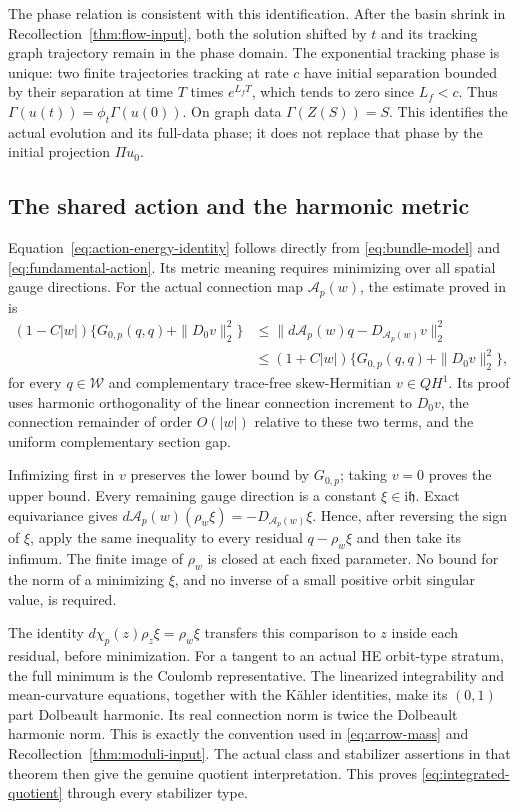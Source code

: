 The phase relation is consistent with this identification.
After the basin shrink in Recollection~\ref{thm:flow-input},
both the solution shifted by $t$ and its tracking graph
trajectory remain in the phase domain. The exponential
tracking phase is unique: two finite trajectories tracking
at rate $c$ have initial separation bounded by their
separation at time $T$ times $e^{L_fT}$, which tends to
zero since $L_f<c$. Thus
$\Gamma(u(t))=\phi_t\Gamma(u(0))$.
On graph data $\Gamma(Z(S))=S$.
This identifies the actual evolution and its full-data
phase; it does not replace that phase by the initial
projection $\Pi u_0$.

\subsection{The shared action and the harmonic metric}

Equation~\eqref{eq:action-energy-identity} follows directly
from \eqref{eq:bundle-model} and
\eqref{eq:fundamental-action}. Its metric meaning requires
minimizing over all spatial gauge directions.
For the actual connection map $\mathcal A_p(w)$, the
estimate proved in \cite[Section~12]{W_HYM} is
\begin{equation}\label{eq:spatial-gauge-comparison}
 \begin{split}
 (1-C|w|)\{G_{0,p}(q,q)+\|D_0v\|_2^2\}
 &\le\|d\mathcal A_p(w)q-D_{\mathcal A_p(w)}v\|_2^2\\
 &\le(1+C|w|)\{G_{0,p}(q,q)+\|D_0v\|_2^2\},
 \end{split}
\end{equation}
for every $q\in\mathcal W$ and complementary trace-free
skew-Hermitian $v\in QH^1$.
Its proof uses harmonic orthogonality of the linear
connection increment to $D_0v$, the connection remainder
of order $O(|w|)$ relative to these two terms, and the
uniform complementary section gap.

Infimizing first in $v$ preserves the lower bound by
$G_{0,p}$; taking $v=0$ proves the upper bound.
Every remaining gauge direction is a constant
$\xi\in\mathrm i\mathfrak h$. Exact equivariance gives
$d\mathcal A_p(w)(\rho_w\xi)=-D_{\mathcal A_p(w)}\xi$.
Hence, after reversing the sign of $\xi$, apply the
same inequality to every residual $q-\rho_w\xi$ and
then take its infimum. The finite image of $\rho_w$
is closed at each fixed parameter. No bound for the
norm of a minimizing $\xi$, and no inverse of a small
positive orbit singular value, is required.

The identity $d\chi_p(z)\rho_z\xi=\rho_w\xi$ transfers
this comparison to $z$ inside each residual, before
minimization. For a tangent to an actual HE orbit-type
stratum, the full minimum is the Coulomb representative.
The linearized integrability and mean-curvature equations,
together with the K\"ahler identities, make its $(0,1)$
part Dolbeault harmonic. Its real connection norm is twice
the Dolbeault harmonic norm. This is exactly the convention
used in \eqref{eq:arrow-mass} and
Recollection~\ref{thm:moduli-input}.
The actual class and stabilizer assertions in that theorem
then give the genuine quotient interpretation.
This proves \eqref{eq:integrated-quotient} through every
stabilizer type.

